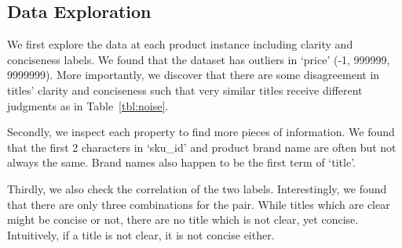 \documentclass[sigconf]{acmart}
\begin{document}
\subsection{Data Exploration}
We first explore the data at each product instance including clarity and conciseness labels. We found that the dataset has outliers in `price' (-1, 999999, 9999999). More importantly, we discover that there are some disagreement in titles' clarity and conciseness such that very similar titles receive different judgments as in Table~\ref{tbl:noise}. %

Secondly, we inspect each property to find more pieces of information. We found that the first 2 characters in `sku\_id' and product brand name are often but not always the same. Brand names also happen to be the first term of `title'. %

Thirdly, we also check the correlation of the two labels. Interestingly, we found that there are only three combinations for the pair. While titles which are clear might be concise or not, there are no title which is not clear, yet concise. Intuitively, if a title is not clear, it is not concise either. 
\end{document}
